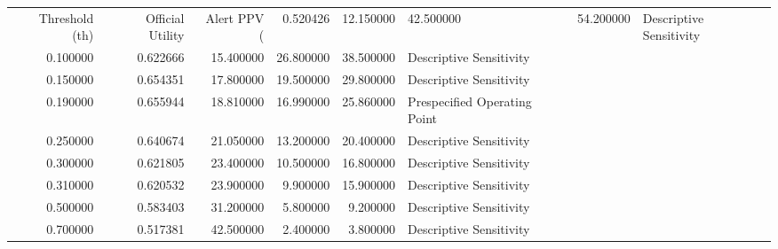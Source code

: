 \begin{tabular}{rrrrrl}
\toprule
Threshold (th) & Official Utility & Alert PPV (%
 & 0.520426 & 12.150000 & 42.500000 & 54.200000 & Descriptive Sensitivity \\
0.100000 & 0.622666 & 15.400000 & 26.800000 & 38.500000 & Descriptive Sensitivity \\
0.150000 & 0.654351 & 17.800000 & 19.500000 & 29.800000 & Descriptive Sensitivity \\
0.190000 & 0.655944 & 18.810000 & 16.990000 & 25.860000 & Prespecified Operating Point \\
0.250000 & 0.640674 & 21.050000 & 13.200000 & 20.400000 & Descriptive Sensitivity \\
0.300000 & 0.621805 & 23.400000 & 10.500000 & 16.800000 & Descriptive Sensitivity \\
0.310000 & 0.620532 & 23.900000 & 9.900000 & 15.900000 & Descriptive Sensitivity \\
0.500000 & 0.583403 & 31.200000 & 5.800000 & 9.200000 & Descriptive Sensitivity \\
0.700000 & 0.517381 & 42.500000 & 2.400000 & 3.800000 & Descriptive Sensitivity \\
\bottomrule
\end{tabular}
